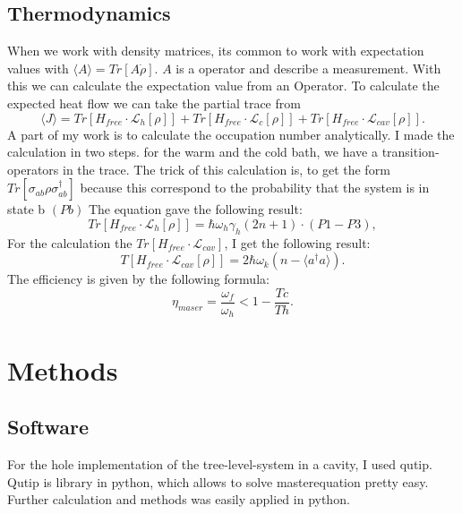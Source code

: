 \documentclass[12pt,a4paper]{article}
\begin{document}
\subsection{Thermodynamics}
 When we work with density matrices, its common to work with expectation values with $\langle A \rangle=Tr[A\dot{\rho}]$.
 $A$ is a operator and describe a measurement.
With this we can calculate the expectation value from an Operator. 
To calculate the expected heat flow we can take the partial trace from 
\begin{equation}
\langle J\rangle=Tr[H_{free}\cdot \mathcal{L}_h[\rho]]+Tr[H_{free}\cdot \mathcal{L}_c[\rho]]+Tr[H_{free}\cdot \mathcal{L}_{cav}[\rho]].
\end{equation}
A part of my work is to calculate the occupation number analytically. 
I made the calculation in two steps. for the warm and the cold bath, we have a transition-operators in the trace.
The trick of this calculation is, to get the form $Tr[\sigma_{ab}\rho \sigma_{ab}^{\dag{}}]$ because this correspond to the probability that the system is in state b $(Pb)$
The equation gave the following result:
\begin{equation}
Tr[H_{free}\cdot \mathcal{L}_h[\rho]]=\hbar \omega_h \gamma_h (2n+1) \cdot( P1-P3) ,
\end{equation}
For the calculation the $Tr[H_{free}\cdot \mathcal{L}_{cav}]$, I get the following result:
\begin{equation}
T[H_{free}\cdot \mathcal{L}_{cav}[\rho]]=2\hbar \omega_k (n-\langle a^{\dag{}}a \rangle).
\end{equation}
The efficiency is given by the following formula:
\begin{equation}
\eta_{maser}=\frac{\omega_f}{\omega_h}<1-\frac{Tc}{Th}.
\end{equation}


\section{Methods}
\subsection{Software}
For the hole implementation of the tree-level-system in a cavity, I used qutip. Qutip is library in python, which allows to solve masterequation pretty easy.
Further calculation and methods was easily applied in python. 
\end{document}
